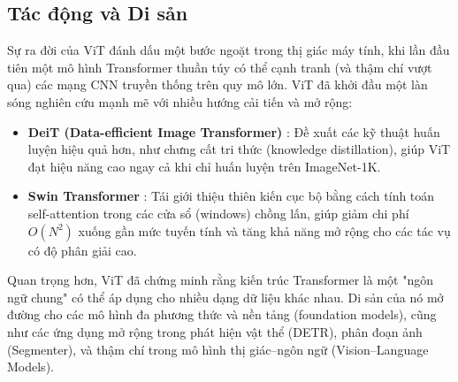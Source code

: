 \subsection{Tác động và Di sản}
\label{subsec:vit_impact_legacy}
Sự ra đời của ViT đánh dấu một bước ngoặt trong thị giác máy tính, khi lần đầu tiên một mô hình Transformer thuần túy có thể cạnh tranh (và thậm chí vượt qua) các mạng CNN truyền thống trên quy mô lớn. ViT đã khởi đầu một làn sóng nghiên cứu mạnh mẽ với nhiều hướng cải tiến và mở rộng:

\begin{itemize}
	\item \textbf{DeiT (Data-efficient Image Transformer)} \cite{Touvron2021}: Đề xuất các kỹ thuật huấn luyện hiệu quả hơn, như chưng cất tri thức (knowledge distillation), giúp ViT đạt hiệu năng cao ngay cả khi chỉ huấn luyện trên ImageNet-1K.
	\item \textbf{Swin Transformer} \cite{Liu2021}: Tái giới thiệu thiên kiến cục bộ bằng cách tính toán self-attention trong các cửa sổ (windows) chồng lấn, giúp giảm chi phí $O(N^2)$ xuống gần mức tuyến tính và tăng khả năng mở rộng cho các tác vụ có độ phân giải cao.
\end{itemize}

Quan trọng hơn, ViT đã chứng minh rằng kiến trúc Transformer là một "ngôn ngữ chung" có thể áp dụng cho nhiều dạng dữ liệu khác nhau. Di sản của nó mở đường cho các mô hình đa phương thức và nền tảng (foundation models), cũng như các ứng dụng mở rộng trong phát hiện vật thể (DETR), phân đoạn ảnh (Segmenter), và thậm chí trong mô hình thị giác–ngôn ngữ (Vision–Language Models).

